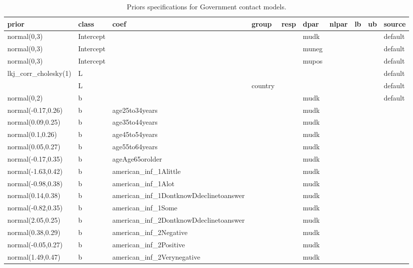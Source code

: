 \documentclass[
]{book}
\theoremstyle{definition}
\theoremstyle{definition}
\theoremstyle{definition}
\theoremstyle{definition}
\theoremstyle{remark}
\begin{document}
\begin{table}

\caption{\label{tab:prior-info-gov}Priors specifications for Government contact models.}
\centering
\fontsize{11}{13}\selectfont
\begin{tabular}[t]{l|l|l|l|l|l|l|l|l|l}
\hline
prior & class & coef & group & resp & dpar & nlpar & lb & ub & source\\
\hline
normal(0,3) & Intercept &  &  &  & mudk &  &  &  & default\\
\hline
normal(0,3) & Intercept &  &  &  & muneg &  &  &  & default\\
\hline
normal(0,3) & Intercept &  &  &  & mupos &  &  &  & default\\
\hline
lkj\_corr\_cholesky(1) & L &  &  &  &  &  &  &  & default\\
\hline
 & L &  & country &  &  &  &  &  & default\\
\hline
normal(0,2) & b &  &  &  & mudk &  &  &  & default\\
\hline
normal(-0.17,0.26) & b & age25to34years &  &  & mudk &  &  &  & \\
\hline
normal(0.09,0.25) & b & age35to44years &  &  & mudk &  &  &  & \\
\hline
normal(0.1,0.26) & b & age45to54years &  &  & mudk &  &  &  & \\
\hline
normal(0.05,0.27) & b & age55to64years &  &  & mudk &  &  &  & \\
\hline
normal(-0.17,0.35) & b & ageAge65orolder &  &  & mudk &  &  &  & \\
\hline
normal(-1.63,0.42) & b & american\_inf\_1Alittle &  &  & mudk &  &  &  & \\
\hline
normal(-0.98,0.38) & b & american\_inf\_1Alot &  &  & mudk &  &  &  & \\
\hline
normal(0.14,0.38) & b & american\_inf\_1DontknowDdeclinetoanswer &  &  & mudk &  &  &  & \\
\hline
normal(-0.82,0.35) & b & american\_inf\_1Some &  &  & mudk &  &  &  & \\
\hline
normal(2.05,0.25) & b & american\_inf\_2DontknowDdeclinetoanswer &  &  & mudk &  &  &  & \\
\hline
normal(0.38,0.29) & b & american\_inf\_2Negative &  &  & mudk &  &  &  & \\
\hline
normal(-0.05,0.27) & b & american\_inf\_2Positive &  &  & mudk &  &  &  & \\
\hline
normal(1.49,0.47) & b & american\_inf\_2Verynegative &  &  & mudk &  &  &  & \\

\end{tabular}
\end{table}
\end{document}
